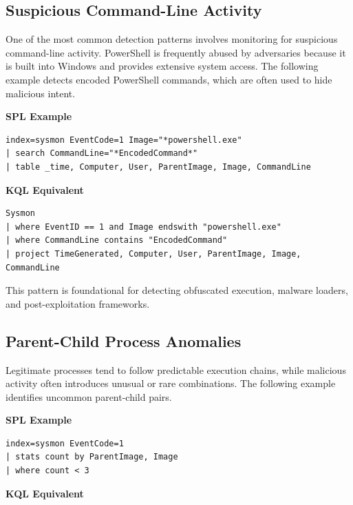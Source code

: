 \subsection*{Suspicious Command-Line Activity}

One of the most common detection patterns involves monitoring for suspicious command-line activity. PowerShell is frequently 
abused by adversaries because it is built into Windows and provides extensive system access. The following example detects 
encoded PowerShell commands, which are often used to hide malicious intent.

\textbf{SPL Example}

\begin{lstlisting}
index=sysmon EventCode=1 Image="*powershell.exe"
| search CommandLine="*EncodedCommand*"
| table _time, Computer, User, ParentImage, Image, CommandLine
\end{lstlisting}

\textbf{KQL Equivalent}

\begin{lstlisting}
Sysmon
| where EventID == 1 and Image endswith "powershell.exe"
| where CommandLine contains "EncodedCommand"
| project TimeGenerated, Computer, User, ParentImage, Image, CommandLine
\end{lstlisting}

This pattern is foundational for detecting obfuscated execution, malware loaders, and post-exploitation frameworks.


\subsection*{Parent-Child Process Anomalies}

Legitimate processes tend to follow predictable execution chains, while malicious activity often introduces unusual or rare 
combinations. The following example identifies uncommon parent-child pairs.

\textbf{SPL Example}

\begin{lstlisting}
index=sysmon EventCode=1
| stats count by ParentImage, Image
| where count < 3
\end{lstlisting}

\textbf{KQL Equivalent}

